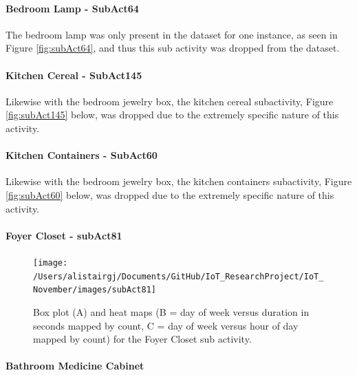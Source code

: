 \documentclass[11pt,]{article}
\let\oldparagraph\paragraph
\renewcommand{\paragraph}[1]{\oldparagraph{#1}\mbox{}}
\begin{document}
\pagebreak

\pagebreak

\hypertarget{bedroom-lamp---subact64}{%
\paragraph{Bedroom Lamp - SubAct64}\label{bedroom-lamp---subact64}}

The bedroom lamp was only present in the dataset for one instance, as
seen in Figure \ref{fig:subAct64}, and thus this sub activity was
dropped from the dataset.

\hypertarget{kitchen-cereal---subact145}{%
\paragraph{Kitchen Cereal -
SubAct145}\label{kitchen-cereal---subact145}}

Likewise with the bedroom jewelry box, the kitchen cereal subactivity,
Figure \ref{fig:subAct145} below, was dropped due to the extremely
specific nature of this activity.

\hypertarget{kitchen-containers---subact60}{%
\paragraph{Kitchen Containers -
SubAct60}\label{kitchen-containers---subact60}}

Likewise with the bedroom jewelry box, the kitchen containers
subactivity, Figure \ref{fig:subAct60} below, was dropped due to the
extremely specific nature of this activity.

\hypertarget{foyer-closet---subact81}{%
\paragraph{Foyer Closet - subAct81}\label{foyer-closet---subact81}}

\begin{figure}[H]

{\centering \texttt{[image: /Users/alistairgj/Documents/GitHub/IoT\_ResearchProject/IoT\_November/images/subAct81]} 

}

\caption{Box plot (A) and heat maps (B = day of week versus duration in seconds mapped by count, C = day of week versus hour of day mapped by count) for the Foyer Closet sub activity.}\label{fig:subAct81}
\end{figure}

\hypertarget{bathroom-medicine-cabinet}{%
\paragraph{Bathroom Medicine Cabinet}\label{bathroom-medicine-cabinet}}
\end{document}
